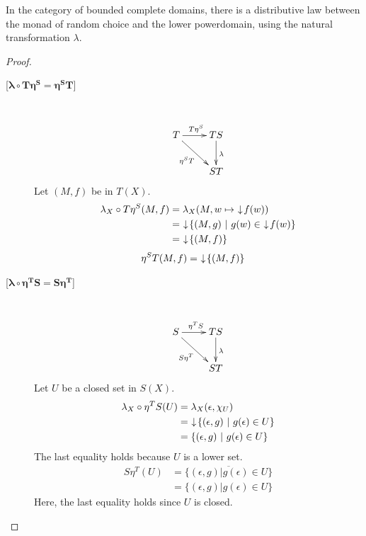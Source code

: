 \begin{proposition}
In the category of bounded complete domains, there is a distributive law between the monad of random choice and the lower powerdomain, using the natural transformation $\lambda$.
\end{proposition}
\begin{proof}
\begin{description}

\item[{[}$\boldsymbol{\lambda\circ T\eta^S = \eta^S T}${]}] \hfill \\
\[
\xymatrix{
T\ar[r]^{T\eta^S}\ar[dr]_{\eta^S T} & TS\ar[d]^{\lambda} \\
& ST
}
\]
Let $(M,f)$ be in $T(X)$.
\begin{align*}
\lambda_X\circ T\eta^S (M,f) &= \lambda_X(M,w\mapsto\, \,\downarrow\! f(w)) \\
&= \,\,\downarrow\! \{(M,g)\ |\ g(w)\in\, \,\downarrow\! f(w)\} \\
&= \,\,\downarrow\! \{(M,f)\}
\end{align*}
\begin{align*}
\eta^S T(M,f) &= \,\,\downarrow\! \{(M,f)\}
\end{align*}

\item[{[}$\boldsymbol{\lambda\circ \eta^T S = S\eta^T}${]}] \hfill \\
\[
\xymatrix{
S\ar[r]^{\eta^T S}\ar[dr]_{S\eta^T} & TS\ar[d]^{\lambda} \\
& ST
}
\]
Let $U$ be a closed set in $S(X)$.
\begin{align*}
\lambda_X\circ \eta^T S (U) &= \lambda_X (\epsilon, \chi_U) \\
&= \,\,\downarrow\! \{(\epsilon, g)\ |\ g(\epsilon) \in U\} \\
&= \{(\epsilon, g)\ |\ g(\epsilon) \in U\}
\end{align*}
The last equality holds because $U$ is a lower set.
\begin{align*}
S\eta^T (U) &= \overline{\{(\epsilon, g)|g(\epsilon) \in U\}} \\
&= \{(\epsilon, g)|g(\epsilon) \in U\}
\end{align*}
Here, the last equality holds since $U$ is closed.


\end{description}
\end{proof}
